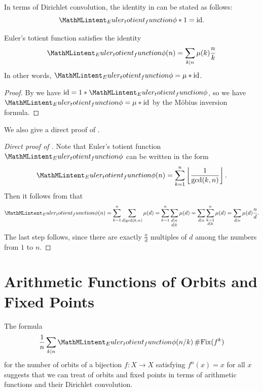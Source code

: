 In terms of Dirichlet convolution, the identity in  can be stated as follows:
\begin{equation*}
  \totient\ast 1=\mathrm{id}.
\end{equation*}

\begin{corollary}\label{corollary:mobius-inversion-totient}
  Euler's totient function satisfies the identity
  \begin{equation*}
    \totient(n) = \sum_{k\mid n}\mu(k)\frac{n}{k}
  \end{equation*}
  In other words, $\totient=\mu\ast\mathrm{id}$.
\end{corollary}

\begin{proof}
  By  we have $\mathrm{id}=1\ast \totient$, so we have $\totient=\mu\ast\mathrm{id}$ by the M\"obius inversion formula.
\end{proof}

We also give a direct proof of .

\begin{proof}[Direct proof of ]
  Note that Euler's totient function $\totient$ can be written in the form
  \begin{equation*}
    \totient(n) = \sum_{k=1}^n\left\lfloor\frac{1}{\gcd(k,n)}\right\rfloor.
  \end{equation*}
  Then it follows from  that
  \begin{equation*}
    \totient(n) = \sum_{k=1}^n\sum_{d\mid \gcd(k,n)}\mu(d)
    = \sum_{k=1}^n\sum_{\substack{d\mid n \\ d\mid k}}\mu(d)
    = \sum_{d\mid n}\sum_{\substack{k=1 \\ d\mid k}}^n \mu(d)
    = \sum_{d\mid n} \mu(d)\frac{n}{d}.
  \end{equation*}
  The last step follows, since there are exactly $\tfrac{n}{d}$ multiples of $d$ among the numbers from $1$ to $n$.
\end{proof}

\section{Arithmetic Functions of Orbits and Fixed Points}

The formula
\begin{equation*}
  \frac{1}{n}\sum_{k\mid n}\totient(n/k)\,\cardinality{\mathrm{Fix}(f^k)}
\end{equation*}
for the number of orbits of a bijection $f:X\to X$ satisfying $f^n(x)=x$ for all $x$ suggests that we can treat of orbits and fixed points in terms of arithmetic functions and their Dirichlet convolution.

